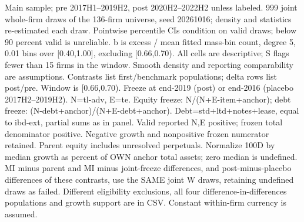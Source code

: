 \begin{threeparttable}
\begin{tablenotes}[flushleft]
\item[] Main sample; pre 2017H1--2019H2, post 2020H2--2022H2 unless labeled. 999 joint whole-firm draws of the 136-firm universe, seed 20261016; density and statistics re-estimated each draw. Pointwise percentile CIs condition on valid draws; below 90 percent valid is unreliable. b is excess / mean fitted mass-bin count, degree 5, 0.01 bins over [0.40,1.00], excluding [0.66,0.70). All cells are descriptive; S flags fewer than 15 firms in the window. Smooth density and reporting comparability are assumptions. Contrasts list first/benchmark populations; delta rows list post/pre. Window is [0.66,0.70). Freeze at end-2019 (post) or end-2016 (placebo 2017H2--2019H2). N=tl-adv, E=te. Equity freeze: N/(N+E-item+anchor); debt freeze: (N-debt+anchor)/(N+E-debt+anchor). Debt=std+ltd+notes+lease, equal to ibd-ext, partial sums as in panel. Valid reported N,E positive; frozen total denominator positive. Negative growth and nonpositive frozen numerator retained. Parent equity includes unresolved perpetuals. Normalize 100D by median growth as percent of OWN anchor total assets; zero median is undefined. MI minus parent and MI minus joint-freeze differences, and post-minus-placebo differences of these contrasts, use the SAME joint W draws, retaining undefined draws as failed. Different eligibility exclusions, all four difference-in-differences populations and growth support are in CSV. Constant within-firm currency is assumed.
\end{tablenotes}
\end{threeparttable}
\endgroup
\par\medskip
\begingroup\scriptsize\setlength{\tabcolsep}{3pt}
